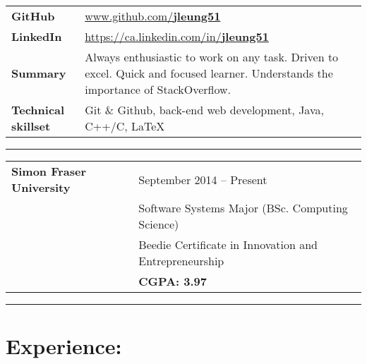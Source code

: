 \begin{table}[!ht]
	\renewcommand{\arraystretch}{1.5}
	\setlength{\tabcolsep}{6pt}
	\centering
	\begin{tabularx}{\textwidth}{ l X }
		\textbf{GitHub} & \href{https://github.com/jleung51}{www.github.com/\textbf{jleung51}} \\
		\textbf{LinkedIn} & \href{https://ca.linkedin.com/in/jleung51}{https://ca.linkedin.com/in/\textbf{jleung51}} \\
		\textbf{Summary} & Always enthusiastic to work on any task. Driven to excel. Quick and focused learner. Understands the importance of StackOverflow. \\
		\textbf{Technical skillset} & Git \& Github, back-end web development, Java, C++/C, \LaTeX
	\end{tabularx}
\end{table}

\vspace*{-\baselineskip} %

\noindent\rule{\textwidth}{0.4pt}

\begin{table}[!ht]
	\renewcommand{\arraystretch}{1.5}
	\setlength{\tabcolsep}{6pt}
	\centering
	\begin{tabularx}{\textwidth}{ l X }
		\textbf{Simon Fraser University} & September 2014 -- Present \\
		& Software Systems Major (BSc. Computing Science) \\
		& Beedie Certificate in Innovation and Entrepreneurship \\
		& \textbf{CGPA: 3.97}
	\end{tabularx}
\end{table}

\vspace*{-\baselineskip} %

\noindent\rule{\textwidth}{0.4pt}

\vspace*{-\baselineskip} %

\section*{Experience:}

